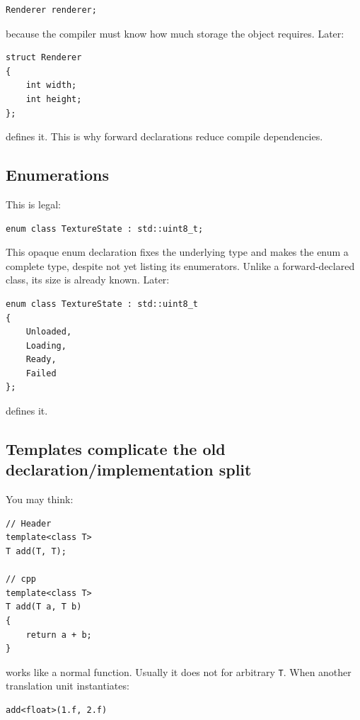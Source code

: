 \begin{verbatim}
Renderer renderer;
\end{verbatim}

because the compiler must know how much storage the object requires. Later:

\begin{verbatim}
struct Renderer
{
    int width;
    int height;
};
\end{verbatim}

defines it. This is why forward declarations reduce compile dependencies.

\subsection{Enumerations}\label{01-foundations-i-ch002-enumerations}

This is legal:

\begin{verbatim}
enum class TextureState : std::uint8_t;
\end{verbatim}

This opaque enum declaration fixes the underlying type and makes the enum a complete type, despite not yet listing its enumerators. Unlike a forward-declared class, its size is already known. Later:

\begin{verbatim}
enum class TextureState : std::uint8_t
{
    Unloaded,
    Loading,
    Ready,
    Failed
};
\end{verbatim}

defines it.

\subsection{Templates complicate the old declaration/implementation split}\label{01-foundations-i-ch002-templates-complicate-the-old-declarationimplementation-split}

You may think:

\begin{verbatim}
// Header
template<class T>
T add(T, T);

// cpp
template<class T>
T add(T a, T b)
{
    return a + b;
}
\end{verbatim}

works like a normal function. Usually it does not for arbitrary \texttt{T}. When another translation unit instantiates:

\begin{verbatim}
add<float>(1.f, 2.f)
\end{verbatim}

